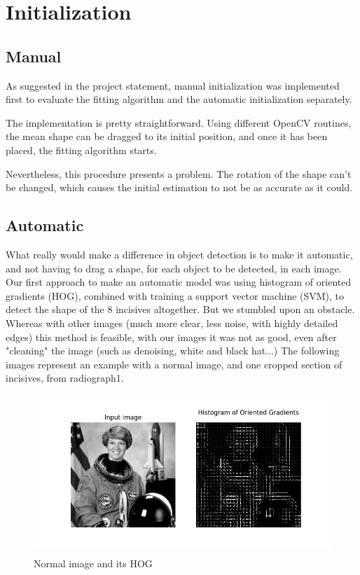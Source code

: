 \section{Initialization}

\subsection{Manual}
As suggested in the project statement, manual initialization
was implemented first to evaluate the fitting algorithm and
the automatic initialization separately.

The implementation is pretty straightforward. Using different
OpenCV routines, the mean shape can be dragged to its initial
position, and once it has been placed, the fitting algorithm starts.

Nevertheless, this procedure presents a problem. The rotation of the
shape can't be changed, which causes the initial estimation to not be
as accurate as it could.

\subsection{Automatic}

What really would make a difference in object detection is to make it automatic,
and not having to drag a shape, for each object to be detected, in each image.
Our first approach to make an automatic model was using histogram of oriented
gradients (HOG), combined with training a support vector machine (SVM), to
detect the shape of the 8 incisives altogether. But we stumbled upon an
obstacle. Whereas with other images (much more clear, less noise, with highly
detailed edges) this method is feasible, with our images it was not as good,
even after "cleaning" the image (such as denoising, white and
black hat...) The following images represent an example with a normal image, 
and one cropped section of incisives, from radiograph1.

\begin{figure}[h]
  \centering
  \includegraphics[height=6cm]{img/astro_hog}
  \caption{Normal image and its HOG}
\end{figure}

